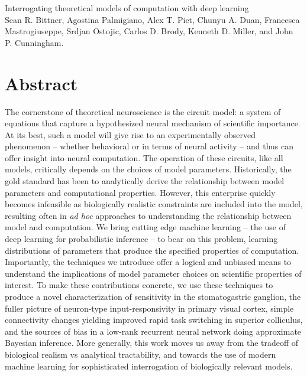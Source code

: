\documentclass[11pt]{article}
\begin{document}
\medskip                        %

\thispagestyle{plain}
{\Large Interrogating theoretical models of computation with deep learning} \\
Sean R. Bittner, Agostina Palmigiano, Alex T. Piet, Chunyu A. Duan, Francesca Mastrogiuseppe, Srdjan Ostojic, Carlos D. Brody, Kenneth D. Miller, and John P. Cunningham.

\linenumbers
\section{Abstract}
The cornerstone of theoretical neuroscience is the circuit model: a system of equations that capture a hypothesized neural mechanism of scientific importance.  At its best, such a model will give rise to an experimentally observed phenomenon -- whether behavioral or in terms of neural activity -- and thus can offer insight into neural computation.  The operation of these circuits, like all models, critically depends on the choices of model parameters.  Historically, the gold standard has been to analytically derive the relationship between model parameters and computational properties.  However, this enterprise quickly becomes infeasible as biologically realistic constraints are included into the model, resulting often in \emph{ad hoc} approaches to understanding the relationship between model and computation.  We bring cutting edge machine learning -- the use of deep learning for probabilistic inference -- to bear on this problem, learning distributions of parameters that produce the specified properties of computation.   Importantly, the techniques we introduce offer a logical and unbiased means to understand the implications of model parameter choices on scientific properties of interest.  To make these contributions concrete, we use these techniques to produce a novel characterization of sensitivity in the stomatogastric ganglion, the fuller picture of neuron-type input-responsivity in primary visual cortex, simple connectivity changes yielding improved rapid task switching in superior colliculus, and the sources of bias in a low-rank recurrent neural network doing approximate Bayesian inference. More generally, this work moves us away from the tradeoff of biological realism vs analytical tractability, and towards the use of modern machine learning for sophisticated interrogation of biologically relevant models.
\end{document}
